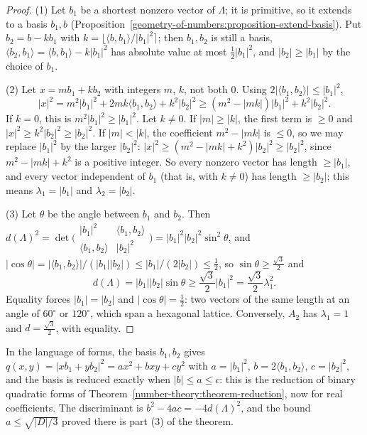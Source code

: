 \begin{proof}
(1) Let $b_1$ be a shortest nonzero vector of $\Lambda$; it is primitive, so it extends to a basis $b_1, b$ (Proposition~\ref{geometry-of-numbers:proposition-extend-basis}). Put
$b_2 = b - kb_1$ with $k = \lfloor\langle b, b_1 \rangle/|b_1|^2\rceil$; then $b_1, b_2$ is still a basis, $\langle b_2, b_1 \rangle = \langle b, b_1 \rangle - k|b_1|^2$ has absolute value at most
$\frac12|b_1|^2$, and $|b_2| \geq |b_1|$ by the choice of $b_1$.

(2) Let $x = mb_1 + kb_2$ with integers $m$, $k$, not both $0$. Using $2|\langle b_1, b_2 \rangle| \leq |b_1|^2$,
\[
|x|^2 = m^2|b_1|^2 + 2mk\langle b_1, b_2 \rangle + k^2|b_2|^2 \geq (m^2 - |mk|)|b_1|^2 + k^2|b_2|^2.
\]
If $k = 0$, this is $m^2|b_1|^2 \geq |b_1|^2$. Let $k \neq 0$. If $|m| \geq |k|$, the first term is $\geq 0$ and $|x|^2 \geq k^2|b_2|^2 \geq |b_2|^2$. If $|m| < |k|$, the coefficient $m^2 - |mk|$ is $\leq 0$, so
we may replace $|b_1|^2$ by the larger $|b_2|^2$: $|x|^2 \geq (m^2 - |mk| + k^2)|b_2|^2 \geq |b_2|^2$, since $m^2 - |mk| + k^2$ is a positive integer. So every nonzero vector has length $\geq |b_1|$, and every
vector independent of $b_1$ (that is, with $k \neq 0$) has length $\geq |b_2|$; this means $\lambda_1 = |b_1|$ and $\lambda_2 = |b_2|$.

(3) Let $\theta$ be the angle between $b_1$ and $b_2$. Then $d(\Lambda)^2 = \det\bigl(\begin{smallmatrix}|b_1|^2 & \langle b_1, b_2 \rangle\\ \langle b_1, b_2 \rangle & |b_2|^2\end{smallmatrix}\bigr) =
|b_1|^2|b_2|^2\sin^2\theta$, and $|\cos\theta| = |\langle b_1, b_2 \rangle|/(|b_1||b_2|) \leq |b_1|/(2|b_2|) \leq \frac12$, so $\sin\theta \geq \frac{\sqrt3}{2}$ and
\[
d(\Lambda) = |b_1||b_2|\sin\theta \geq \frac{\sqrt3}{2}|b_1|^2 = \frac{\sqrt3}{2}\lambda_1^2.
\]
Equality forces $|b_1| = |b_2|$ and $|\cos\theta| = \frac12$: two vectors of the same length at an angle of $60^\circ$ or $120^\circ$, which span a hexagonal lattice. Conversely, $A_2$ has $\lambda_1 = 1$
and $d = \frac{\sqrt3}{2}$, with equality.
\end{proof}

\begin{remark}\label{geometry-of-numbers:remark-reduced-forms}
In the language of forms, the basis $b_1, b_2$ gives $q(x, y) = |xb_1 + yb_2|^2 = ax^2 + bxy + cy^2$ with $a = |b_1|^2$, $b = 2\langle b_1, b_2 \rangle$, $c = |b_2|^2$, and the basis is reduced exactly
when $|b| \leq a \leq c$: this is the reduction of binary quadratic forms of Theorem~\ref{number-theory:theorem-reduction}, now for real coefficients. The discriminant is $b^2 - 4ac = -4d(\Lambda)^2$,
and the bound $a \leq \sqrt{|D|/3}$ proved there is part (3) of the theorem.
\end{remark}

